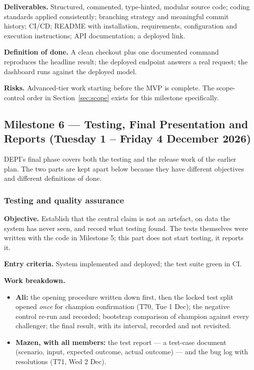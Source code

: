 \documentclass[11pt,a4paper]{article}
\begin{document}
\textbf{Deliverables.} Structured, commented, type-hinted, modular source code; coding standards
applied consistently; branching strategy and meaningful commit history; CI/CD; README with
installation, requirements, configuration and execution instructions; API documentation; a deployed
link.

\textbf{Definition of done.} A clean checkout plus one documented command reproduces the headline
result; the deployed endpoint answers a real request; the dashboard runs against the deployed model.

\textbf{Risks.} Advanced-tier work starting before the MVP is complete. The scope-control order in
Section~\ref{sec:scope} exists for this milestone specifically.

\subsection{Milestone 6 --- Testing, Final Presentation and Reports (Tuesday 1 -- Friday 4 December 2026)}

DEPI's final phase covers both the testing and the release work of the earlier plan. The two parts
are kept apart below because they have different objectives and different definitions of done.

\subsubsection*{Testing and quality assurance}

\textbf{Objective.} Establish that the central claim is not an artefact, on data the system has
never seen, and record what testing found. The tests themselves were written with the code in
Milestone 5; this part does not start testing, it reports it.

\textbf{Entry criteria.} System implemented and deployed; the test suite green in CI.

\textbf{Work breakdown.}
\begin{itemize}
\item \textbf{Ali:} the opening procedure written down first, then the locked test split opened
\emph{once} for champion confirmation (T70, Tue 1 Dec); the negative control re-run and recorded;
bootstrap comparison of champion against every challenger; the final result, with its interval,
recorded and not revisited.
\item \textbf{Mazen, with all members:} the test report --- a test-case document (scenario, input,
expected outcome, actual outcome) --- and the bug log with resolutions (T71, Wed 2 Dec).
\end{itemize}
\end{document}
